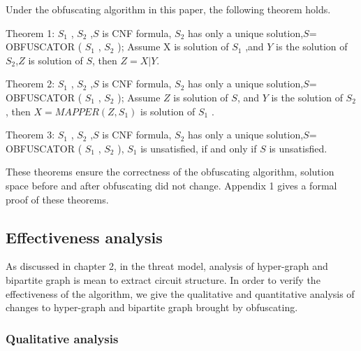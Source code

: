 \documentclass[runningheads,a4paper]{llncs}
\begin{document}
Under the obfuscating algorithm in this paper, the following theorem holds.

Theorem 1: $S_1$ , $S_2$ ,$S$ is CNF formula, $S_2$ has only a unique solution,$S$= OBFUSCATOR ( $S_1$ , $S_2$ ); 
Assume X is solution of $S_1$ ,and $Y$ is the solution of $S_2$,$Z$ is solution of $S$,
then $Z = X | Y$.

Theorem 2: $S_1$ , $S_2$ ,$S$ is CNF formula, $S_2$ has only a unique solution,$S$= OBFUSCATOR ( $S_1$ , $S_2$ ); 
Assume $Z$ is solution of $S$, and $Y$ is the solution of $S_2$ , 
then $X = MAPPER (Z, S_1)$ is solution of $S_1$ .

Theorem 3: $S_1$ , $S_2$ ,$S$ is CNF formula, $S_2$ has only a unique solution,$S$= OBFUSCATOR ( $S_1$ , $S_2$ ),
$S_1$  is unsatisfied, if and only if $S$ is unsatisfied.

These theorems ensure the correctness of the obfuscating algorithm, solution space before and after obfuscating did not change. Appendix 1 gives a formal proof of these theorems.
\subsection{Effectiveness analysis}

As discussed in chapter 2, in the threat model, analysis of hyper-graph and bipartite graph is mean to extract circuit structure. In order to verify the effectiveness of the algorithm, we give the qualitative and quantitative analysis of changes to hyper-graph and bipartite graph brought by obfuscating.
\subsubsection{Qualitative analysis}
\end{document}

